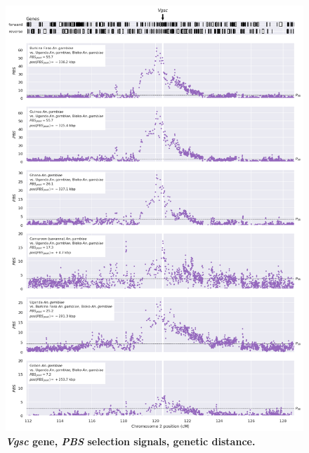 \documentclass[a4paper,11pt,abstracton,hidelinks]{scrartcl}
\begin{document}
\begin{figure}[t!]
	\begin{center}
		\includegraphics*[width=1\linewidth,center]{artwork/locus_vgsc_pbs_gdist.png}
	\end{center}
	\caption[\textit{Vgsc} gene, \textit{PBS} selection signals, genetic distance]{
	\textbf{\textit{Vgsc} gene, \textit{PBS} selection signals, genetic distance.}
	} 
	\label{fig:locus_vgsc_pbs_gdist}
\end{figure}


\clearpage
\end{document}
